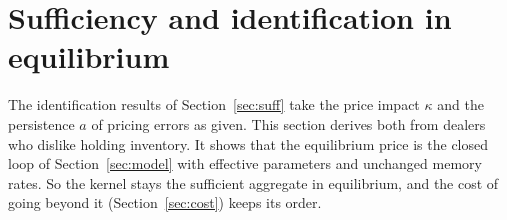 \section{Sufficiency and identification in equilibrium}\label{sec:equilibrium}

The identification results of Section~\ref{sec:suff} take the price impact $\kappa$ and the persistence $a$ of pricing errors as given. This section derives both from dealers who dislike holding inventory. It shows that the equilibrium price is the closed loop of Section~\ref{sec:model} with effective parameters and unchanged memory rates. So the kernel stays the sufficient aggregate in equilibrium, and the cost of going beyond it (Section~\ref{sec:cost}) keeps its order.

